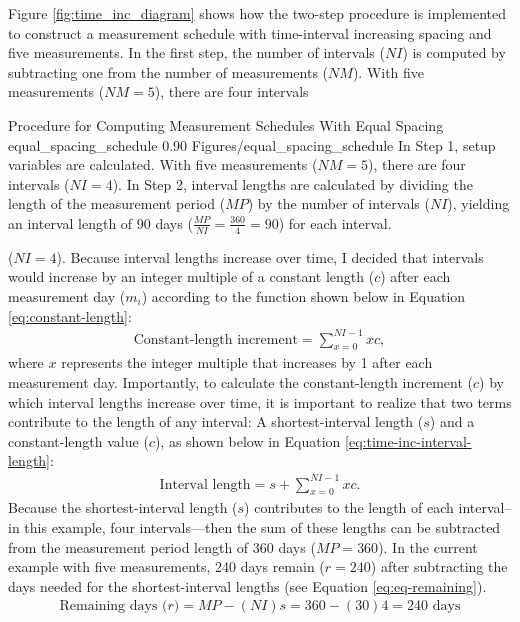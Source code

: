\documentclass[
12pt, %
twoside,
english]{guelphthesis}
\begin{document}
Figure \ref{fig:time_inc_diagram} shows how the two-step procedure is implemented to construct a measurement schedule with time-interval increasing spacing and five measurements. In the first step, the number of intervals (\(NI\)) is computed by subtracting one from the number of measurements (\(NM\)). With five measurements (\(NM = 5\)), there are four intervals
\begin{apaFigure}
[landscape]
[samepage]
{Procedure for Computing Measurement Schedules With Equal Spacing}
{equal_spacing_schedule}
{0.90}
{Figures/equal_spacing_schedule}
{In Step 1, setup variables are calculated. With five measurements ($NM = 5$), there are four intervals ($NI = 4$). In Step 2, interval lengths are calculated by dividing the length of the measurement period ($MP$) by the number of intervals ($NI$), yielding an interval length of 90 days ($\frac{MP}{NI} = \frac{360}{4} = 90$) for each interval.}
\end{apaFigure}
\noindent (\(NI = 4\)). Because interval lengths increase over time, I decided that intervals would increase by an integer multiple of a constant length (\(c\)) after each measurement day (\(m_i\)) according to the function shown below in Equation \ref{eq:constant-length}:
\begin{align}
\text{Constant-length increment} = \sum^{NI - 1}_{x=0} xc, 
  \label{eq:constant-length} 
\end{align}
where \(x\) represents the integer multiple that increases by 1 after each measurement day. Importantly, to calculate the constant-length increment (\(c\)) by which interval lengths increase over time, it is important to realize that two terms contribute to the length of any interval: A shortest-interval length (\(s\)) and a constant-length value (\(c\)), as shown below in Equation \ref{eq:time-inc-interval-length}:
\begin{align}
\text{Interval length} = s + \sum^{NI - 1}_{x=0} xc. 
  \label{eq:time-inc-interval-length} 
\end{align}
\noindent Because the shortest-interval length (\(s\)) contributes to the length of each interval--in this example, four intervals---then the sum of these lengths can be subtracted from the measurement period length of 360 days (\(MP = 360\)). In the current example with five measurements, 240 days remain (\(r = 240\)) after subtracting the days needed for the shortest-interval lengths (see Equation \ref{eq:eq-remaining}).
\begin{align}
\text{Remaining days (} \textit{r})  = MP - (NI)s = 360 - (30)4 = 240 \text{ days}
  \label{eq:eq-remaining} 
\end{align}
\end{document}
